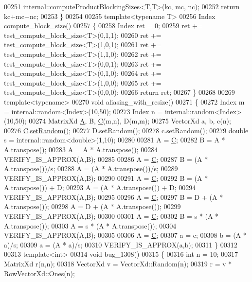 \begin{DoxyCode}
00251   internal::computeProductBlockingSizes<T,T>(kc, mc, nc);
00252   \textcolor{keywordflow}{return} kc+mc+nc;
00253 \}
00254 
00255 \textcolor{keyword}{template}<\textcolor{keyword}{typename} T>
00256 Index compute\_block\_size()
00257 \{
00258   Index ret = 0;
00259   ret += test\_compute\_block\_size<T>(0,1,1);
00260   ret += test\_compute\_block\_size<T>(1,0,1);
00261   ret += test\_compute\_block\_size<T>(1,1,0);
00262   ret += test\_compute\_block\_size<T>(0,0,1);
00263   ret += test\_compute\_block\_size<T>(0,1,0);
00264   ret += test\_compute\_block\_size<T>(1,0,0);
00265   ret += test\_compute\_block\_size<T>(0,0,0);
00266   \textcolor{keywordflow}{return} ret;
00267 \}
00268 
00269 \textcolor{keyword}{template}<\textcolor{keyword}{typename}>
00270 \textcolor{keywordtype}{void} aliasing\_with\_resize()
00271 \{
00272   Index m = internal::random<Index>(10,50);
00273   Index n = internal::random<Index>(10,50);
00274   MatrixXd \hyperlink{group___core___module_class_eigen_1_1_matrix}{A}, B, \hyperlink{group___core___module}{C}(m,n), D(m,m);
00275   VectorXd a, b, c(n);
00276   \hyperlink{group___core___module}{C}.\hyperlink{class_eigen_1_1_plain_object_base_af0e576a0e1aefc9ee346de44cc352ba3}{setRandom}();
00277   D.setRandom();
00278   c.setRandom();
00279   \textcolor{keywordtype}{double} s = internal::random<double>(1,10);
00280 
00281   A = \hyperlink{group___core___module}{C};
00282   B = A * A.transpose();
00283   A = A * A.transpose();
00284   VERIFY\_IS\_APPROX(A,B);
00285 
00286   A = \hyperlink{group___core___module}{C};
00287   B = (A * A.transpose())/s;
00288   A = (A * A.transpose())/s;
00289   VERIFY\_IS\_APPROX(A,B);
00290 
00291   A = \hyperlink{group___core___module}{C};
00292   B = (A * A.transpose()) + D;
00293   A = (A * A.transpose()) + D;
00294   VERIFY\_IS\_APPROX(A,B);
00295 
00296   A = \hyperlink{group___core___module}{C};
00297   B = D + (A * A.transpose());
00298   A = D + (A * A.transpose());
00299   VERIFY\_IS\_APPROX(A,B);
00300 
00301   A = \hyperlink{group___core___module}{C};
00302   B = s * (A * A.transpose());
00303   A = s * (A * A.transpose());
00304   VERIFY\_IS\_APPROX(A,B);
00305 
00306   A = \hyperlink{group___core___module}{C};
00307   a = c;
00308   b = (A * a)/s;
00309   a = (A * a)/s;
00310   VERIFY\_IS\_APPROX(a,b);
00311 \}
00312 
00313 \textcolor{keyword}{template}<\textcolor{keywordtype}{int}>
00314 \textcolor{keywordtype}{void} bug\_1308()
00315 \{
00316   \textcolor{keywordtype}{int} n = 10;
00317   MatrixXd r(n,n);
00318   VectorXd v = VectorXd::Random(n);
00319   r = v * RowVectorXd::Ones(n);

\end{DoxyCode}

